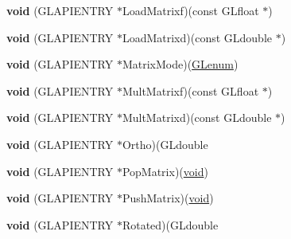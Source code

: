 \begin{DoxyCompactItemize}
{\bfseries void} (G\+L\+A\+P\+I\+E\+N\+T\+RY $\ast$Load\+Matrixf)(const G\+Lfloat $\ast$)
\item 
\mbox{\label{struct_____g_ldispatch_table_rec_ab44f85f2ae044a2c75f5465c7e25ed0d}} 
{\bfseries void} (G\+L\+A\+P\+I\+E\+N\+T\+RY $\ast$Load\+Matrixd)(const G\+Ldouble $\ast$)
\item 
\mbox{\label{struct_____g_ldispatch_table_rec_af8a7b6247b9f5b49ae0402f8b2e47b9a}} 
{\bfseries void} (G\+L\+A\+P\+I\+E\+N\+T\+RY $\ast$Matrix\+Mode)(\hyperlink{interfacevoid}{G\+Lenum})
\item 
\mbox{\label{struct_____g_ldispatch_table_rec_a74fb6a6000329c15137f7ec7d1d80de4}} 
{\bfseries void} (G\+L\+A\+P\+I\+E\+N\+T\+RY $\ast$Mult\+Matrixf)(const G\+Lfloat $\ast$)
\item 
\mbox{\label{struct_____g_ldispatch_table_rec_a66cf454aa9df04a841feae7e0d975693}} 
{\bfseries void} (G\+L\+A\+P\+I\+E\+N\+T\+RY $\ast$Mult\+Matrixd)(const G\+Ldouble $\ast$)
\item 
\mbox{\label{struct_____g_ldispatch_table_rec_ac0226b1c7c23598df5340012ef08911e}} 
{\bfseries void} (G\+L\+A\+P\+I\+E\+N\+T\+RY $\ast$Ortho)(G\+Ldouble
\item 
\mbox{\label{struct_____g_ldispatch_table_rec_a28a5850fc768acbd42ed7bffcc00c366}} 
{\bfseries void} (G\+L\+A\+P\+I\+E\+N\+T\+RY $\ast$Pop\+Matrix)(\hyperlink{interfacevoid}{void})
\item 
\mbox{\label{struct_____g_ldispatch_table_rec_a4e116415d1b9428ccf62567dd9c2e35a}} 
{\bfseries void} (G\+L\+A\+P\+I\+E\+N\+T\+RY $\ast$Push\+Matrix)(\hyperlink{interfacevoid}{void})
\item 
\mbox{\label{struct_____g_ldispatch_table_rec_a4e01ccf0b0e4a8e950cc9a4f1a8f4e3d}} 
{\bfseries void} (G\+L\+A\+P\+I\+E\+N\+T\+RY $\ast$Rotated)(G\+Ldouble
\item 
\mbox{\label{struct_____g_ldispatch_table_rec_ad2121078bb5cb48115d5a68b4300cc0c}} 

\end{DoxyCompactItemize}
